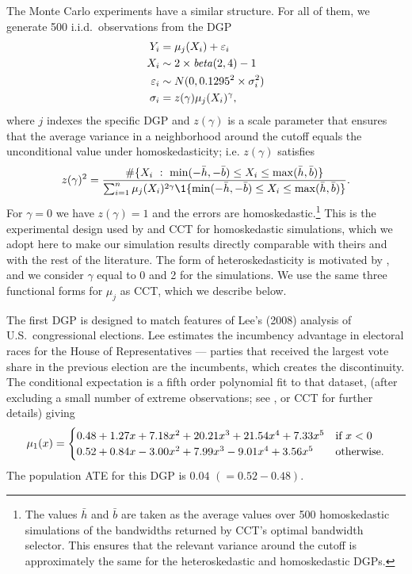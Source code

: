 \documentclass[12pt,fleqn]{article}
\begin{document}
The Monte Carlo experiments have a similar structure. For all of them, we generate 500 i.i.d.\ observations from the DGP
\begin{align*}
Y_{i}           &= \mu_{j}(X_{i}) + \varepsilon_{i} \\
X_{i}           &\sim  2 \times \operatorname{\mathit{beta}}(2,4) - 1 \\
\varepsilon_{i} &\sim N(0, 0.1295^2 \times \sigma_i^2) \\
\sigma_i &= z(\gamma) \mu_{j}(X_{i})^\gamma ,
\end{align*}
where $j$ indexes the specific DGP and $z(\gamma)$ is a scale parameter that
ensures that the average variance in a neighborhood around the cutoff
equals the unconditional value under homoskedasticity; i.e. $z(\gamma)$
satisfies
\[
  z(\gamma)^2
    = \frac{    {\#\{X_i\ :\ \min(-\bar h, -\bar b) \leq X_i \leq \max(\bar h, \bar b)\}}}
  {\sum_{i = 1}^n \mu_{j}(X_{i})^{2 \gamma}
  \1\{\min(-\bar h, -\bar b) \leq X_i \leq \max(\bar h,\bar b)\}}.
\]
For $\gamma = 0$ we have $z(\gamma) = 1$ and the errors are
homoskedastic.\footnote{%
  The values $\bar h$ and $\bar b$ are taken as the average values over 500
  homoskedastic simulations of the bandwidths returned by CCT's optimal
  bandwidth selector. This ensures that the relevant variance around the cutoff
  is approximately the same for the heteroskedastic and homoskedastic DGPs.} %
This is the experimental design used by \citet{IK} and CCT for homoskedastic
simulations, which we adopt here to make our simulation results directly
comparable with theirs and with the rest of the literature.  The form of
heteroskedasticity is motivated by \cite{mackinnon2013thirty}, and we consider
$\gamma$ equal to 0 and 2 for the simulations.
We use the same three functional forms for $\mu_{j}$ as CCT, which we describe below.

\nocite{lee2008rand}%
The first DGP is designed to match features of Lee's (2008) analysis of U.S.\
congressional elections. Lee estimates the incumbency advantage in electoral 
races for the House of Representatives --- parties that received the largest 
vote share in the previous election are the incumbents, which creates the 
discontinuity. The conditional expectation is a fifth order polynomial fit to 
that dataset, (after excluding a small number of extreme observations; see 
\citealp{IK}, or CCT for further details) giving
\begin{equation*}
  \mu_{1}(x) =
  \begin{cases}
    0.48 + 1.27x + 7.18x^{2} + 20.21x^{3} + 21.54x^{4} + 7.33x^{5}
    & \text{if}\ x < 0 \\
    0.52 + 0.84x - 3.00x^{2} + 7.99x^3 - 9.01x^4 + 3.56x^{5}
    & \text{otherwise}.
  \end{cases}
\end{equation*}
The population ATE for this DGP is $0.04$ $(= 0.52 - 0.48)$.
\end{document}
